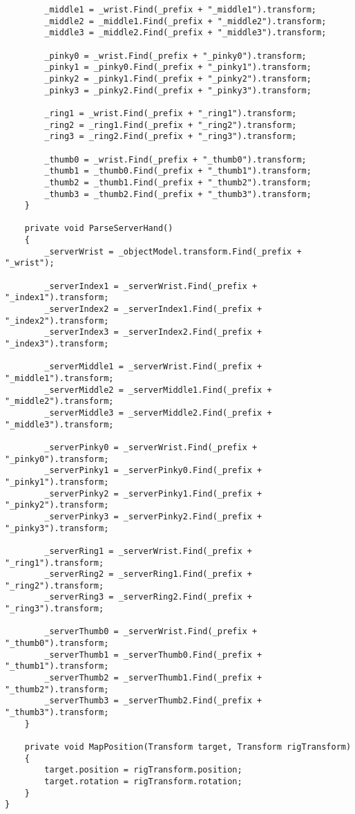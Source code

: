 \begin{verbatim}
        _middle1 = _wrist.Find(_prefix + "_middle1").transform;
        _middle2 = _middle1.Find(_prefix + "_middle2").transform;
        _middle3 = _middle2.Find(_prefix + "_middle3").transform;

        _pinky0 = _wrist.Find(_prefix + "_pinky0").transform;
        _pinky1 = _pinky0.Find(_prefix + "_pinky1").transform;
        _pinky2 = _pinky1.Find(_prefix + "_pinky2").transform;
        _pinky3 = _pinky2.Find(_prefix + "_pinky3").transform;

        _ring1 = _wrist.Find(_prefix + "_ring1").transform;
        _ring2 = _ring1.Find(_prefix + "_ring2").transform;
        _ring3 = _ring2.Find(_prefix + "_ring3").transform;

        _thumb0 = _wrist.Find(_prefix + "_thumb0").transform;
        _thumb1 = _thumb0.Find(_prefix + "_thumb1").transform;
        _thumb2 = _thumb1.Find(_prefix + "_thumb2").transform;
        _thumb3 = _thumb2.Find(_prefix + "_thumb3").transform;
    }

    private void ParseServerHand()
    {
        _serverWrist = _objectModel.transform.Find(_prefix + "_wrist");

        _serverIndex1 = _serverWrist.Find(_prefix + "_index1").transform;
        _serverIndex2 = _serverIndex1.Find(_prefix + "_index2").transform;
        _serverIndex3 = _serverIndex2.Find(_prefix + "_index3").transform;

        _serverMiddle1 = _serverWrist.Find(_prefix + "_middle1").transform;
        _serverMiddle2 = _serverMiddle1.Find(_prefix + "_middle2").transform;
        _serverMiddle3 = _serverMiddle2.Find(_prefix + "_middle3").transform;

        _serverPinky0 = _serverWrist.Find(_prefix + "_pinky0").transform;
        _serverPinky1 = _serverPinky0.Find(_prefix + "_pinky1").transform;
        _serverPinky2 = _serverPinky1.Find(_prefix + "_pinky2").transform;
        _serverPinky3 = _serverPinky2.Find(_prefix + "_pinky3").transform;

        _serverRing1 = _serverWrist.Find(_prefix + "_ring1").transform;
        _serverRing2 = _serverRing1.Find(_prefix + "_ring2").transform;
        _serverRing3 = _serverRing2.Find(_prefix + "_ring3").transform;

        _serverThumb0 = _serverWrist.Find(_prefix + "_thumb0").transform;
        _serverThumb1 = _serverThumb0.Find(_prefix + "_thumb1").transform;
        _serverThumb2 = _serverThumb1.Find(_prefix + "_thumb2").transform;
        _serverThumb3 = _serverThumb2.Find(_prefix + "_thumb3").transform;
    }

    private void MapPosition(Transform target, Transform rigTransform)
    {
        target.position = rigTransform.position;
        target.rotation = rigTransform.rotation;
    }
}

\end{verbatim}
